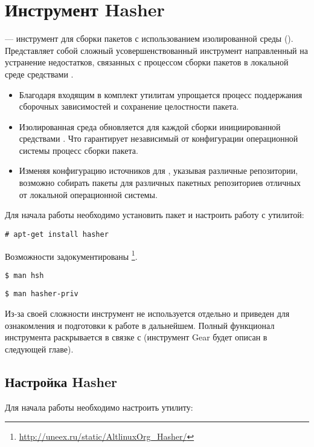 \hypertarget{5}{\chapter{Инструмент Hasher}}
 --- инструмент для сборки пакетов с использованием изолированной среды ().
Представляет собой сложный усовершенствованный инструмент направленный на устранение недостатков,
связанных с процессом сборки пакетов в локальной среде средствами .
\begin{itemize}
	    \item Благодаря входящим в комплект утилитам упрощается процесс поддержания сборочных зависимостей и сохранение
целостности пакета.
	    \item  Изолированная среда обновляется для каждой сборки инициированной средствами . Что
гарантирует независимый от конфигурации операционной системы процесс сборки пакета.
	    \item  Изменяя конфигурацию источников для , указывая различные
репозитории, возможно собирать пакеты для различных пакетных репозиториев отличных от локальной
операционной системы.
\end{itemize}

Для начала работы необходимо установить пакет  и настроить работу с утилитой:
\begin{verbatim}
# apt-get install hasher
\end{verbatim}

Возможности  задокументированы%
\footnote{\href{http://uneex.ru/static/AltlinuxOrg_Hasher/}{http://uneex.ru/static/AltlinuxOrg\_Hasher/}}.
 \begin{verbatim}
$ man hsh
\end{verbatim}

\begin{verbatim}
$ man hasher-priv
\end{verbatim}

Из-за своей сложности инструмент не используется отдельно и приведен для ознакомления и
подготовки к работе в дальнейшем. Полный функционал инструмента раскрывается в связке
с (инструмент Gear будет описан в следующей главе).

\hypertarget{5.1}{\section{Настройка Hasher}}
Для начала работы необходимо настроить утилиту:

